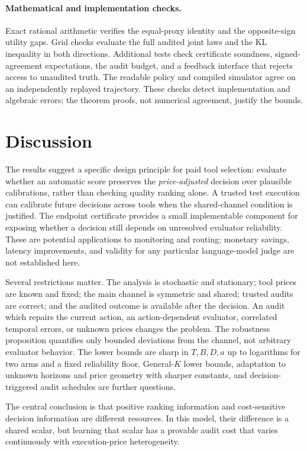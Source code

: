 \paragraph{Mathematical and implementation checks.}
Exact rational arithmetic verifies the equal-proxy identity and the opposite-sign utility gaps. Grid checks evaluate the full audited joint laws and the KL inequality in both directions. Additional tests check certificate soundness, signed-agreement expectations, the audit budget, and a feedback interface that rejects access to unaudited truth. The readable policy and compiled simulator agree on an independently replayed trajectory. These checks detect implementation and algebraic errors; the theorem proofs, not numerical agreement, justify the bounds.

\section{Discussion}
The results suggest a specific design principle for paid tool selection: evaluate whether an automatic score preserves the \emph{price-adjusted} decision over plausible calibrations, rather than checking quality ranking alone. A trusted test execution can calibrate future decisions across tools when the shared-channel condition is justified. The endpoint certificate provides a small implementable component for exposing whether a decision still depends on unresolved evaluator reliability. These are potential applications to monitoring and routing; monetary savings, latency improvements, and validity for any particular language-model judge are not established here.

Several restrictions matter. The analysis is stochastic and stationary; tool prices are known and fixed; the main channel is symmetric and shared; trusted audits are correct; and the audited outcome is available after the decision. An audit which repairs the current action, an action-dependent evaluator, correlated temporal errors, or unknown prices changes the problem. The robustness proposition quantifies only bounded deviations from the channel, not arbitrary evaluator behavior. The lower bounds are sharp in $T,B,D,a$ up to logarithms for two arms and a fixed reliability floor. General-$K$ lower bounds, adaptation to unknown horizons and price geometry with sharper constants, and decision-triggered audit schedules are further questions.

The central conclusion is that positive ranking information and cost-sensitive decision information are different resources. In this model, their difference is a shared scalar, but learning that scalar has a provable audit cost that varies continuously with execution-price heterogeneity.

